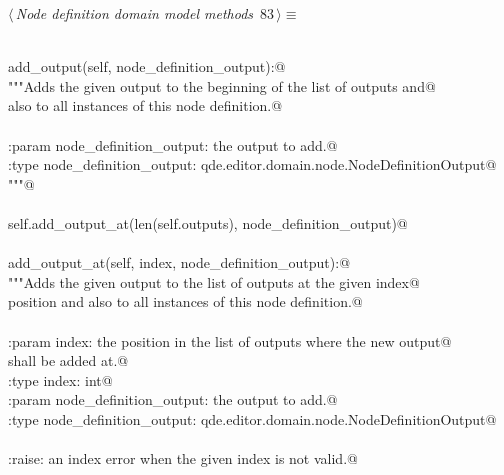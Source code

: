 \documentclass[
    a4paper,      %
    10pt,         %
    openright,    %
    notitlepage,  %
    parskip=half, %
]{scrreprt}       %
\theoremstyle{definition}                    %
\begin{document}
\begin{flushleft} \small
\begin{minipage}{\linewidth}\label{scrap133}\raggedright\small
{} $\langle\,${\itshape Node definition domain model methods}\nobreak\ {\footnotesize {83}}$\,\rangle\equiv$
\vspace{-1exm}
\begin{list}{}{} \item
\mbox{}\lstinline@@\\
\mbox{}\lstinline@def add_output(self, node_definition_output):@\\
\mbox{}\lstinline@    """Adds the given output to the beginning of the list of outputs and@\\
\mbox{}\lstinline@    also to all instances of this node definition.@\\
\mbox{}\lstinline@@\\
\mbox{}\lstinline@    :param node_definition_output: the output to add.@\\
\mbox{}\lstinline@    :type  node_definition_output: qde.editor.domain.node.NodeDefinitionOutput@\\
\mbox{}\lstinline@    """@\\
\mbox{}\lstinline@@\\
\mbox{}\lstinline@    self.add_output_at(len(self.outputs), node_definition_output)@\\
\mbox{}\lstinline@@\\
\mbox{}\lstinline@def add_output_at(self, index, node_definition_output):@\\
\mbox{}\lstinline@    """Adds the given output to the list of outputs at the given index@\\
\mbox{}\lstinline@    position and also to all instances of this node definition.@\\
\mbox{}\lstinline@@\\
\mbox{}\lstinline@    :param index: the position in the list of outputs where the new output@\\
\mbox{}\lstinline@                  shall be added at.@\\
\mbox{}\lstinline@    :type  index: int@\\
\mbox{}\lstinline@    :param node_definition_output: the output to add.@\\
\mbox{}\lstinline@    :type  node_definition_output: qde.editor.domain.node.NodeDefinitionOutput@\\
\mbox{}\lstinline@@\\
\mbox{}\lstinline@    :raise: an index error when the given index is not valid.@\\

\end{list}
\end{minipage}
\end{flushleft}
\end{document}
